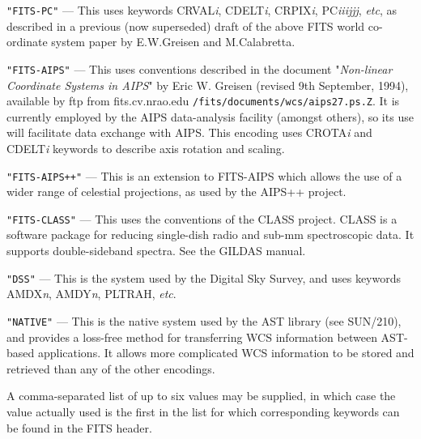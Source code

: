 \documentclass[twoside,11pt]{article}
\newcommand{\htmladdnormallink}[2]{#1}
\newcommand{\xref}[3]{#1}
\newcommand{\sstitem}{\item}
\newcommand{\sstitem}{\item}
\begin{document}
{{{{         \sstitem
            \texttt{"FITS-PC"} --- This uses keywords CRVAL\textit{i},
            CDELT\textit{i}, CRPIX\textit{i}, PC\textit{iiijjj}, 
            \textit{etc}, as described in a previous (now superseded) draft of
            the above FITS world co-ordinate system paper by E.W.Greisen and 
            M.Calabretta.

         \sstitem
            \texttt{"FITS-AIPS"} --- This uses conventions described in the
            document "\textit{Non-linear Coordinate Systems in AIPS}" by
            Eric W. Greisen (revised 9th September, 1994), available by ftp
            from fits.cv.nrao.edu \texttt{/fits/documents/wcs/aips27.ps.Z}. 
            It is currently employed by the AIPS data-analysis facility
            (amongst others), so its use will facilitate data exchange with
            AIPS. This encoding uses CROTA\textit{i} and CDELT\textit{i}
            keywords to describe axis rotation and scaling.

         \sstitem
            \texttt{"FITS-AIPS++"} --- This is an extension to FITS-AIPS which 
            allows the use of a wider range of celestial projections, as used by
            the AIPS++ project.

         \sstitem
            \texttt{"FITS-CLASS"} --- This uses the conventions of the CLASS
            project.  CLASS is a software package for reducing 
            single-dish radio and sub-mm spectroscopic data.  It 
            supports double-sideband spectra.  See 
            \htmladdnormallink{the GILDAS 
            manual}{http://www.iram.fr/IRAMFR/GILDAS/doc/html/class-html/class.html}.

         \sstitem
            \texttt{"DSS"} --- This is the system used by the Digital Sky Survey,
            and uses keywords AMDX\textit{n}, AMDY\textit{n}, PLTRAH, 
            \emph{etc}.

         \sstitem
            \texttt{"NATIVE"} --- This is the native system used by the  
            AST library (see \xref{SUN/210}{sun210}{}), and provides a
            loss-free method for transferring WCS information between
            AST-based applications.  It allows more complicated WCS
            information to be stored and retrieved than any of the other
            encodings.
         }
         A comma-separated list of up to six values may be supplied, in
         which case the value actually used is the first in the list for
         which corresponding keywords can be found in the FITS header.

}}}
\end{document}
